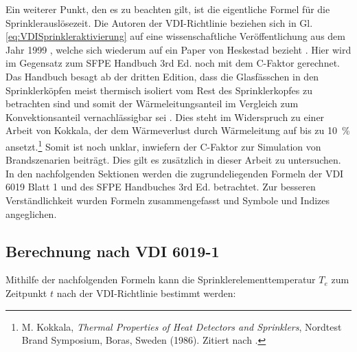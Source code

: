 Ein weiterer Punkt, den es zu beachten gilt, ist die eigentliche Formel für die Sprinklerauslösezeit. Die Autoren der VDI-Richtlinie beziehen sich in Gl. \ref{eq:VDISprinkleraktivierung} auf eine wissenschaftliche Veröffentlichung aus dem Jahr 1999 \cite{Davis1999}, welche sich wiederum auf ein Paper von Heskestad bezieht \cite{Heskestad1988}. Hier wird im Gegensatz zum SFPE Handbuch 3rd Ed. noch mit dem C-Faktor gerechnet.
Das Handbuch besagt ab der dritten Edition, dass die Glasfässchen in den Sprinklerköpfen meist thermisch isoliert vom Rest des Sprinklerkopfes zu betrachten sind und somit der Wärmeleitungsanteil im Vergleich zum Konvektionsanteil vernachlässigbar sei \cite[Kap. 4, S. 5]{SFPE3rd}. Dies steht im Widerspruch zu einer Arbeit von Kokkala, der dem Wärmeverlust durch Wärmeleitung auf bis zu 10~\% ansetzt.\footnote{M. Kokkala, \emph{Thermal Properties of Heat Detectors
and Sprinklers}, Nordtest Brand Symposium, Boras,
Sweden (1986). Zitiert nach \cite[Kap. 4, S. 6]{SFPE3rd}.} 
Somit ist noch unklar, inwiefern der C-Faktor zur Simulation von Brandszenarien beiträgt. Dies gilt es zusätzlich in dieser Arbeit zu untersuchen. In den nachfolgenden Sektionen werden die zugrundeliegenden Formeln der VDI 6019 Blatt 1 und des SFPE Handbuches 3rd Ed. betrachtet. Zur besseren Verständlichkeit wurden Formeln zusammengefasst und Symbole und Indizes angeglichen.






\subsection{Berechnung nach VDI 6019-1}
\label{BerechnungenausVDI}

Mithilfe der nachfolgenden Formeln kann die Sprinklerelementtemperatur $T_e$ zum Zeitpunkt $t$ nach der VDI-Richtlinie bestimmt werden: 

